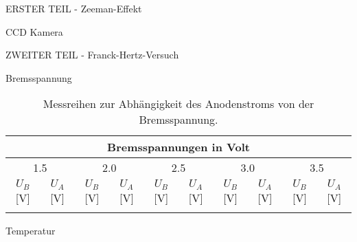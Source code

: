 \begin{appendix}
\begin{chapter}{ERSTER TEIL - Zeeman-Effekt}
\begin{section}{CCD Kamera}
    \end{section}
    
  \end{chapter}
  
  
  
  \begin{chapter}{ZWEITER TEIL - Franck-Hertz-Versuch}
    \label{Anhang:chp:ZWEITERTEIL}
    
    
    
    \begin{section}{Bremsspannung}
      \label{Anhang:chp:ZWEITERTEILbremsspannung}
      
      \begin{scriptsize}
        \begin{longtable}[htbp]{|c|c|c|c|c|c|c|c|c|c|}
          \hline
          \multicolumn{10}{|c|}{Bremsspannungen in Volt} \\ \hline 
          \multicolumn{2}{|c|}{1.5} & \multicolumn{2}{|c|}{2.0} &
          \multicolumn{2}{|c|}{2.5} & \multicolumn{2}{|c|}{3.0} & 
          \multicolumn{2}{|c|}{3.5} \\ \hline
          $U_{B}$ [V] & $U_{A}$ [V] & $U_{B}$ [V] & $U_{A}$ [V] &
          $U_{B}$ [V] & $U_{A}$ [V] & $U_{B}$ [V] & $U_{A}$ [V] &
          $U_{B}$ [V] & $U_{A}$ [V] \\ \hline\hline \endhead
          
          \caption{Messreihen zur Abhängigkeit des Anodenstroms von der
              Bremsspannung.}
          \label{tab:FHbremsspannung}
        \end{longtable}
      \end{scriptsize}
      
    \end{section}
    
    
    
    \newpage
    \begin{section}{Temperatur}
      \label{Anhang:chp:ZWEITERTEILtemperatur}
      

\end{section}
\end{chapter}
\end{appendix}
